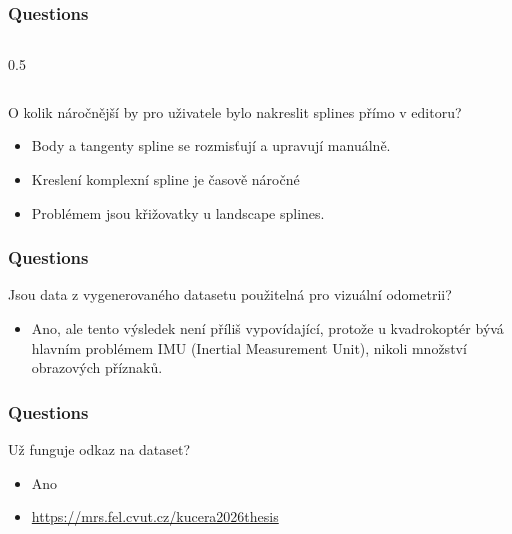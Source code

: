 \documentclass[aspectratio=169,9pt]{beamer}
\begin{document}
\begin{frame}
\frametitle{Questions}	
	
\begin{columns}[T,onlytextwidth]
	
\begin{column}{0.5\textwidth}
	
\end{column}	

\end{columns}

\centering
\begin{minipage}{0.7\textwidth}
	\begin{block}{O kolik náročnější by pro uživatele bylo nakreslit splines přímo v editoru?}
		\begin{itemize}
			\item Body a tangenty spline se rozmisťují a upravují manuálně.
			\item Kreslení komplexní spline je časově náročné
			\item Problémem jsou křižovatky u landscape splines.
		\end{itemize}
	\end{block}
\end{minipage}
	
\end{frame}

\begin{frame}
\frametitle{Questions}	

\centering
\begin{minipage}{0.7\textwidth}
	\begin{block}{Jsou data z vygenerovaného datasetu použitelná pro vizuální odometrii?}
		\begin{itemize}
			\item Ano, ale tento výsledek není příliš vypovídající, protože u kvadrokoptér bývá hlavním problémem IMU (Inertial Measurement Unit), nikoli množství obrazových příznaků.
		\end{itemize}
	\end{block}
\end{minipage}

\end{frame}

\begin{frame}
\frametitle{Questions}	
	
\centering
\begin{minipage}{0.7\textwidth}
	\begin{block}{Už funguje odkaz na dataset?}
		\begin{itemize}
			\item Ano
			\item \url{https://mrs.fel.cvut.cz/kucera2026thesis}
		\end{itemize}
	\end{block}
\end{minipage}
	
\end{frame}
\end{document}
